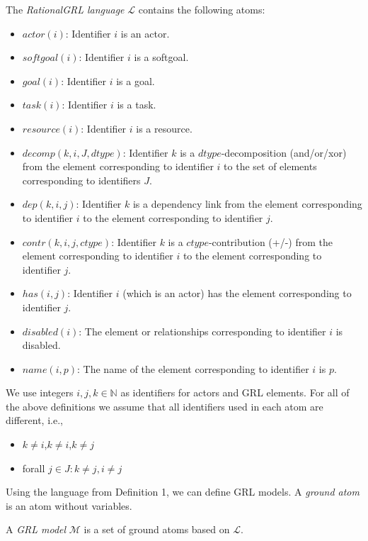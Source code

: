 \begin{definition}
The \emph{RationalGRL language} $\mathcal{L}$ contains the following atoms:
\begin{itemize}
\item $actor(i)$: Identifier $i$ is an actor.
\item $softgoal(i)$: Identifier $i$ is a softgoal.
\item $goal(i)$: Identifier $i$ is a goal.
\item $task(i)$: Identifier $i$ is a task.
\item $resource(i)$: Identifier $i$ is a resource.
\item $decomp(k,i,J,dtype)$: Identifier $k$ is a $dtype$-decomposition (and/or/xor) from the element corresponding to identifier $i$ to the set of elements corresponding to identifiers $J$.
\item $dep(k,i,j)$: Identifier $k$ is a dependency link from the element corresponding to identifier $i$ to the element corresponding to identifier $j$.
\item $contr(k,i,j,ctype)$: Identifier $k$ is a $ctype$-contribution (+/-) from the element corresponding to identifier $i$ to the element corresponding to identifier $j$.
\item $has(i,j)$: Identifier $i$ (which is an actor) has the element corresponding to identifier $j$.
\item $disabled(i)$: The element or relationships corresponding to identifier $i$ is disabled.
\item $name(i,p)$: The name of the element corresponding to identifier $i$ is $p$.
\end{itemize}

We use integers $i,j,k\in\mathbb{N}$ as identifiers for actors and GRL elements. For all of the above definitions we assume that all identifiers used in each atom are different, i.e.,
\begin{itemize}
\item $k\not=i$,$k\not=i$,$k\not=j$
\item forall $j\in J: k\not=j, i\not=j$
\end{itemize}
\end{definition}

Using the language from Definition 1, we can define GRL models. A \emph{ground atom} is an atom without variables.

\begin{definition} \label{def:argument}
A \emph{GRL model} $\mathcal{M}$ is a set of ground atoms based on $\mathcal{L}$.
\end{definition}

